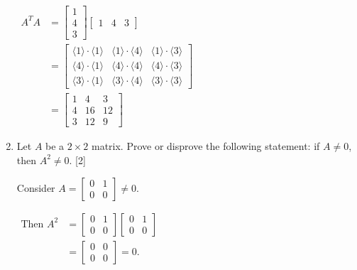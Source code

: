 \documentclass[11pt]{article}
\begin{document}
\begin{enumerate}
    \(
        \begin{aligned}
            A^TA &= \begin{bmatrix}1\\4\\3\end{bmatrix}\begin{bmatrix} 1 & 4 & 3 \end{bmatrix}\\
                &= \begin{bmatrix}
                    \langle1\rangle\cdot\langle1\rangle & \langle1\rangle\cdot\langle4\rangle & \langle1\rangle\cdot\langle3\rangle\\
                    \langle4\rangle\cdot\langle1\rangle & \langle4\rangle\cdot\langle4\rangle & \langle4\rangle\cdot\langle3\rangle\\
                    \langle3\rangle\cdot\langle1\rangle & \langle3\rangle\cdot\langle4\rangle & \langle3\rangle\cdot\langle3\rangle
                \end{bmatrix}\\
                &= \begin{bmatrix}
                    1 & 4 & 3\\
                    4 & 16 & 12\\
                    3 & 12 & 9
                    \end{bmatrix} 
        \end{aligned}
    \)

    \color{black}

    \item Let \(A\) be a \(2\times2\) matrix. Prove or disprove the following statement:
    if \(A\neq 0\), then \(A^2 \neq 0\). \hfill [2]
    
    \color{blue}
    Consider \(A = \begin{bmatrix} 0 & 1\\ 0 & 0\end{bmatrix} \neq 0\).

    \(
        \begin{aligned}
        \text{Then } A^2 &= \begin{bmatrix} 0 & 1\\ 0 & 0\end{bmatrix} \begin{bmatrix} 0 & 1\\ 0 & 0\end{bmatrix}\\
            &= \begin{bmatrix} 0 & 0\\ 0 & 0\end{bmatrix} = 0.
        \end{aligned}
    \)


\end{enumerate}
\end{document}
